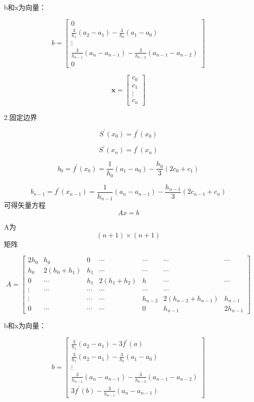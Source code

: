 \documentclass[UTF8]{ctexart}
\begin{document}
b和x为向量：


$$
b=\left[\begin{array}{c}{0} \\ {\frac{3}{h_{1}}\left(a_{2}-a_{1}\right)-\frac{3}{h_{0}}\left(a_{1}-a_{0}\right)} \\ {\vdots} \\ {\frac{3}{h_{n-1}}\left(a_{n}-a_{n-1}\right)-\frac{3}{h_{n-2}}\left(a_{n-1}-a_{n-2}\right)} \\ {0}\end{array}\right]
$$


$$
\boldsymbol{x}=\left[\begin{array}{c}{c_{0}} \\ {c_{1}} \\ {\vdots} \\ {c_{n}}\end{array}\right]
$$

2.固定边界

$$ S^{\prime}(x_0)=f^{\prime}(x_0)$$

$$ S^{\prime}(x_n)=f^{\prime}(x_n)$$

$$
b_{0}=f^{\prime}(x_0)=\frac{1}{h_{0}}\left(a_{1}-a_{0}\right)-\frac{h_{0}}{3}\left(2 c_{0}+c_{1}\right)
$$

$$
b_{n-1}=f^{\prime}(x_{n-1})=\frac{1}{h_{n-1}}\left(a_{n}-a_{n-1}\right)-\frac{h_{n-1}}{3}\left(2 c_{n-1}+c_{n}\right)
$$
可得矢量方程$$ Ax=b$$


A为$$ (n+1)\times (n+1)$$矩阵


$$
A=\left[\begin{array}{lllllll}
{2h_0} & {h_0} & {0} & {\cdots} & {\cdots} & {\cdots} & {\cdots} \\ 
{h_{0}} & {2\left(h_{0}+h_{1}\right)} & {h_{1}} & {\cdots} & {\cdots} & {\cdots} \\ 
{0} & {\cdots} & {h_{1} } & {2\left(h_{1}+h_{2}\right)} & {h} & {\cdots} & {\cdots} \\ 
{\vdots} & {\cdots} & {\cdots} & {\cdots} & {\cdots} & {\cdots} \\ 
{\vdots} & {} & {\cdots} & {\cdots} & {h_{n-2}} & { 2(h_{n-2}+h_{n-1})} & {h_{n-1}} \\ 
{0} & {\cdots} & {\cdots} & {\cdots}  & {0} & {h_{n-1}} & {2h_{n-1}}
\end{array}\right]
$$

b和x为向量：


$$
b=\left[\begin{array}{c}{\frac{3}{h_{1}}\left(a_{2}-a_{1}\right)-{3}{f^{\prime}(a)}} \\ {\frac{3}{h_{1}}\left(a_{2}-a_{1}\right)-\frac{3}{h_{0}}\left(a_{1}-a_{0}\right)} \\ {\vdots} \\ {\frac{3}{h_{n-1}}\left(a_{n}-a_{n-1}\right)-\frac{3}{h_{n-2}}\left(a_{n-1}-a_{n-2}\right)} \\ {3}{f^{\prime}(b)}-\frac{3}{h_{n-1}}(a_n-a_{n-1})\end{array}\right]
$$
\end{document}
